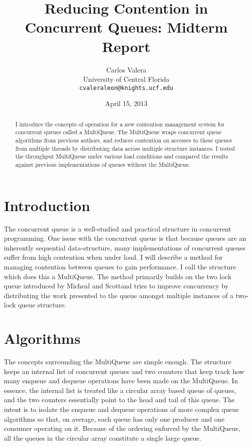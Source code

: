 \documentclass[12pt]{report}
\begin{document}
\title{Reducing Contention in Concurrent Queues: Midterm Report}
\author{Carlos Valera \\
    University of Central Florida \\
    \texttt{cvaleraleon@knights.ucf.edu}}
\date{April 15, 2013}
\maketitle
\begin{abstract}
I introduce the concepts of operation for a new contention management system
for concurrent queues called a MultiQueue. The MultiQueue wraps concurrent
queue algorithms from previous authors, and reduces contention on accesses to
these queues from multiple threads by distributing data across multiple
structure instances. I tested the throughput MultiQueue under various
load conditions and compared the results against previous implementations of
queues without the MultiQueue.
\end{abstract}
\section{Introduction}
The concurrent queue is a well-studied and practical structure in concurrent
programming. One issue with the concurrent queue is that because queues are an
inherently sequential data-structure, many implementations of concurrent queues
suffer from high contention when under load. I will describe a method for
managing contention between queues to gain performance. I call the structure
which does this a MultiQueue. The method primarily builds on the two lock queue
introduced by Micheal and Scott\cite{michael1996}and tries to improve
concurrency by distributing the work presented to the queue amongst multiple
instances of a two-lock queue structure.

\section{Algorithms}
The concepts surrounding the MultiQueue are simple enough. The structure keeps
an internal list of concurrent queues and two counters that keep track how many
enqueue and dequeue operations have been made on the MultiQueue. In essence,
the internal list is treated like a circular array based queue of queues, and
the two counters essentially point to the head and tail of this queue. The
intent is to isolate the enqueue and dequeue operations of more complex queue
algorithms so that, on average, each queue has only one producer and one
consumer operating on it. Because of the ordering enforced by the MultiQueue,
all the queues in the circular array constitute a single large queue.
\end{document}
